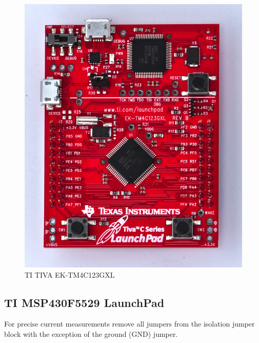 \documentclass[twoside,11pt]{cergdoc}
\begin{document}
\begin{figure}[ht]
\begin{minipage}{.5\textwidth}
    \includegraphics[scale=0.6]{figures/ek-tm4c123gxl}
    \caption{TI TIVA EK-TM4C123GXL}\label{fig:tiva}
  \end{minipage}
\vspace{-1ex}
\end{figure}


\subsection{TI MSP430F5529 LaunchPad\texttrademark}

For precise current measurements remove all jumpers from the isolation jumper block 
with the exception of the ground (GND) jumper. 
\end{document}
